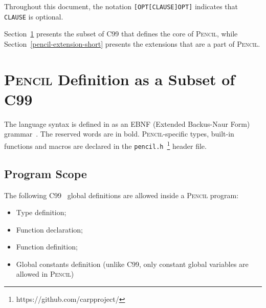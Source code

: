 \documentclass{carp}
\newcommand\pencil{\textsc{Pencil}\xspace}
\newcommand{\C}{C99\xspace}
\begin{document}
Throughout this document, the notation \lstinline![OPT[CLAUSE]OPT]! indicates
that \lstinline!CLAUSE! is optional.

Section~\ref{pencil-c99-subset} presents the subset of C99 that
defines the core of \pencil, while Section~\ref{pencil-extension-short}
presents the extensions that are a part of \pencil.

\section{\pencil Definition as a Subset of C99}
\label{pencil-c99-subset}
The language syntax is defined in  as an EBNF (Extended
Backus-Naur Form) grammar~\cite{wirth1996EBNF}.
The reserved words are in bold.
\pencil-specific types, built-in functions and macros are declared in
the \texttt{pencil.h}~\footnote{https://github.com/carpproject/}
header file.



\subsection{Program Scope}
The following \C~\cite{c99} global definitions are allowed inside a
\pencil program:
\begin{itemize}
  \item Type definition;
  \item Function declaration;
  \item Function definition;
  \item Global constants definition (unlike \C, only constant global variables
        are allowed in \pencil)
\end{itemize}
\end{document}
